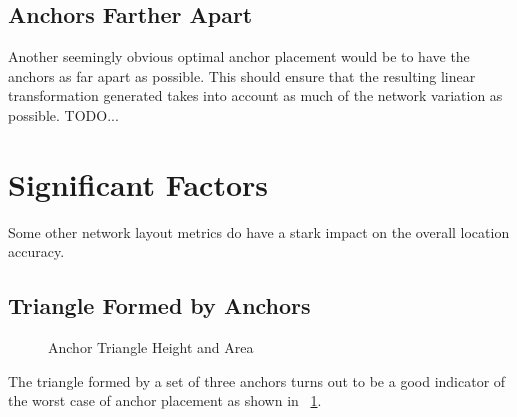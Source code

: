 \subsection{Anchors Farther Apart}

Another seemingly obvious optimal anchor placement would be to have the anchors as far apart as possible.  This should ensure that the resulting linear transformation generated takes into account as much of the network variation as possible.   TODO...

\section{Significant Factors}

Some other network layout metrics do have a stark impact on the overall location accuracy.

\subsection{Triangle Formed by Anchors}

\begin{figure}
  \centering
    \caption{Anchor Triangle Height and Area}
    \label{fig:TriangleAreaHeight1}
\end{figure}

The triangle formed by a set of three anchors turns out to be a good indicator of the worst case of anchor placement as shown in ~\ref{fig:TriangleAreaHeight1}.
